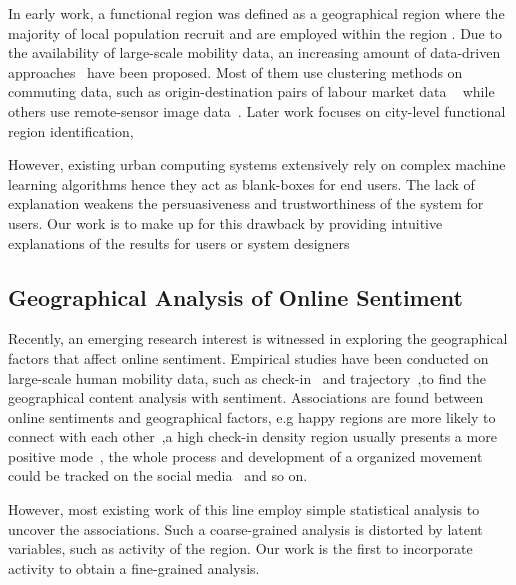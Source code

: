 \documentclass[runningheads]{llncs}
\begin{document}
In early work, a functional region was defined as a geographical region where the majority of local population recruit and are employed within the region \cite{Ball1980Definition}.
Due to the availability of large-scale mobility data, an increasing amount of data-driven approaches~\cite{Farmer2009Overview} have been proposed.
Most of them use clustering methods on commuting data, such as origin-destination pairs of labour market data ~\cite{Karlsson2006FunctionalRegionSummary} while others use remote-sensor image data~\cite{Vatsavai2011Remote}.
Later work focuses on city-level functional region identification,

However, existing urban computing systems extensively rely on complex machine learning algorithms hence they act as blank-boxes for end users.
The lack of explanation weakens the persuasiveness and trustworthiness of the system for users.
Our work is to make up for this drawback by providing intuitive explanations of the results for users or system designers

\subsection{Geographical Analysis of Online Sentiment}

Recently, an emerging research interest is witnessed in exploring the geographical factors that affect online sentiment.
Empirical studies have been conducted on large-scale human mobility data, such as check-in ~\cite{Gallegos16happier}and trajectory~\cite{Gonzlez2008Track},to find the geographical content analysis with sentiment.
Associations are found between online sentiments and geographical factors, e.g happy regions are more likely to connect with each other~\cite{Alshamsi15milan},a high check-in density region usually presents a more positive mode~\cite{Gallegos16happier}, the whole process and development of a organized movement could be tracked on the social media~\cite{Alvarez2015Movement} and so on.

However, most existing work of this line employ simple statistical analysis to uncover the associations.
Such a coarse-grained analysis is distorted by latent variables, such as activity of the region.
Our work is the first to incorporate activity to obtain a fine-grained analysis.
\end{document}
